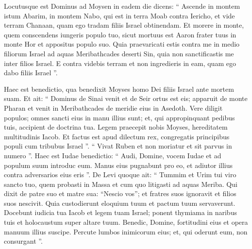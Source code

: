 \begin{biblechapter}
\begin{biblechapter}
\begin{biblechapter}
\begin{biblechapter}
\begin{biblechapter}
\begin{biblechapter}
\begin{biblechapter}
\begin{biblechapter}
\begin{biblechapter}
\begin{biblechapter}
\begin{biblechapter}
\begin{biblechapter}
\begin{biblechapter}
\begin{biblechapter}
\begin{biblechapter}
\begin{biblechapter}
\begin{biblechapter}
\begin{biblechapter}
\begin{biblechapter}
\begin{biblechapter}
\begin{biblechapter}
\begin{biblechapter}
\begin{biblechapter}
\begin{biblechapter}
\begin{biblechapter}
\begin{biblechapter}
\begin{biblechapter}
\begin{biblechapter}
\begin{biblechapter}
\begin{biblechapter}
\begin{biblechapter}
\begin{biblechapter}
 \verse Locutusque est Dominus ad Moysen in eadem die dicens: 
\verse “ Ascende in montem istum Abarim, in montem Nabo, qui est in terra Moab contra Iericho, et vide terram Chanaan, quam ego tradam filiis Israel obtinendam. 
\verse Et morere in monte, quem conscendens iungeris populo tuo, sicut mortuus est Aaron frater tuus in monte Hor et appositus populo suo. 
\verse Quia praevaricati estis contra me in medio filiorum Israel ad aquas Meribathcades deserti Sin, quia non sanctificastis me inter filios Israel. 
\verse E contra videbis terram et non ingredieris in eam, quam ego dabo filiis Israel ”.
 
\begin{biblechapter}
\verse Haec est benedictio, qua benedixit Moyses homo Dei filiis Israel ante mortem suam. 
 \verse Et ait:
 “ Dominus de Sinai venit
 et de Seir ortus est eis;
 apparuit de monte Pharan
 et venit in Meribathcades
 de meridie eius in Asedoth.
 \verse Vere diligit populos;
 omnes sancti eius in manu illius sunt;
 et, qui appropinquant pedibus tuis,
 accipient de doctrina tua.
 \verse Legem praecepit nobis Moyses,
 hereditatem multitudinis Iacob.
 \verse Et factus est apud dilectum rex,
 congregatis principibus populi
 cum tribubus Israel ”.
 \verse “ Vivat Ruben et non moriatur
 et sit parvus in numero ”.
 \verse Haec est Iudae benedictio:
 “ Audi, Domine, vocem Iudae
 et ad populum suum introduc eum.
 Manus eius pugnabunt pro eo,
 et adiutor illius contra adversarios eius eris ”.
 \verse De Levi quoque ait:
 “ Tummim et Urim tui
 viro sancto tuo,
 quem probasti in Massa
 et cum quo litigasti ad aquas Meriba.
 \verse Qui dixit de patre suo et matre sua:
 “Nescio vos”;
 et fratres suos ignoravit
 et filios suos nescivit.
 Quia custodierunt eloquium tuum
 et pactum tuum servaverunt.
 \verse Docebunt iudicia tua Iacob
 et legem tuam Israel;
 ponent thymiama in naribus tuis
 et holocaustum super altare tuum.
 \verse Benedic, Domine, fortitudini eius
 et opera manuum illius suscipe.
 Percute lumbos inimicorum eius;
 et, qui oderunt eum, non consurgant ”.

\end{biblechapter}
\end{biblechapter}
\end{biblechapter}
\end{biblechapter}
\end{biblechapter}
\end{biblechapter}
\end{biblechapter}
\end{biblechapter}
\end{biblechapter}
\end{biblechapter}
\end{biblechapter}
\end{biblechapter}
\end{biblechapter}
\end{biblechapter}
\end{biblechapter}
\end{biblechapter}
\end{biblechapter}
\end{biblechapter}
\end{biblechapter}
\end{biblechapter}
\end{biblechapter}
\end{biblechapter}
\end{biblechapter}
\end{biblechapter}
\end{biblechapter}
\end{biblechapter}
\end{biblechapter}
\end{biblechapter}
\end{biblechapter}
\end{biblechapter}
\end{biblechapter}
\end{biblechapter}
\end{biblechapter}
